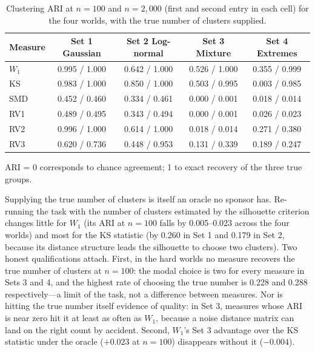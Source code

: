 \documentclass[AMA,Times1COL]{WileyNJDv5}
\begin{document}
\begin{table}[ht]
\centering
\caption{Clustering ARI at $n = 100$ and $n = 2{,}000$ (first and second entry in each cell) for the four worlds, with the true number of clusters supplied.\label{tab:study2_ari}}
\begin{tabular}{lcccc}
\toprule
\textbf{Measure} & \textbf{Set 1 Gaussian} & \textbf{Set 2 Log-normal} & \textbf{Set 3 Mixture} & \textbf{Set 4 Extremes} \\
\midrule
$W_1$ & 0.995 / 1.000 & 0.642 / 1.000 & 0.526 / 1.000 & 0.355 / 0.999 \\
KS    & 0.983 / 1.000 & 0.850 / 1.000 & 0.503 / 0.995 & 0.003 / 0.985 \\
SMD   & 0.452 / 0.460 & 0.334 / 0.461 & 0.000 / 0.001 & 0.018 / 0.014 \\
RV1   & 0.489 / 0.495 & 0.343 / 0.494 & 0.000 / 0.001 & 0.026 / 0.023 \\
RV2   & 0.996 / 1.000 & 0.614 / 1.000 & 0.018 / 0.014 & 0.271 / 0.380 \\
RV3   & 0.620 / 0.736 & 0.448 / 0.953 & 0.131 / 0.339 & 0.189 / 0.247 \\
\bottomrule
\end{tabular}
\begin{tablenotes}
\item ARI = 0 corresponds to chance agreement; 1 to exact recovery of the three true groups.
\end{tablenotes}
\end{table}

Supplying the true number of clusters is itself an oracle no sponsor has. Re-running the task with the number of clusters estimated by the silhouette criterion changes little for $W_1$ (its ARI at $n = 100$ falls by 0.005--0.023 across the four worlds) and most for the KS statistic (by 0.260 in Set 1 and 0.179 in Set 2, because its distance structure leads the silhouette to choose two clusters). Two honest qualifications attach. First, in the hard worlds no measure recovers the true number of clusters at $n = 100$: the modal choice is two for every measure in Sets 3 and 4, and the highest rate of choosing the true number is 0.228 and 0.288 respectively---a limit of the task, not a difference between measures. Nor is hitting the true number itself evidence of quality: in Set 3, measures whose ARI is near zero hit it at least as often as $W_1$, because a noise distance matrix can land on the right count by accident. Second, $W_1$'s Set 3 advantage over the KS statistic under the oracle ($+0.023$ at $n = 100$) disappears without it ($-0.004$).
\end{document}
